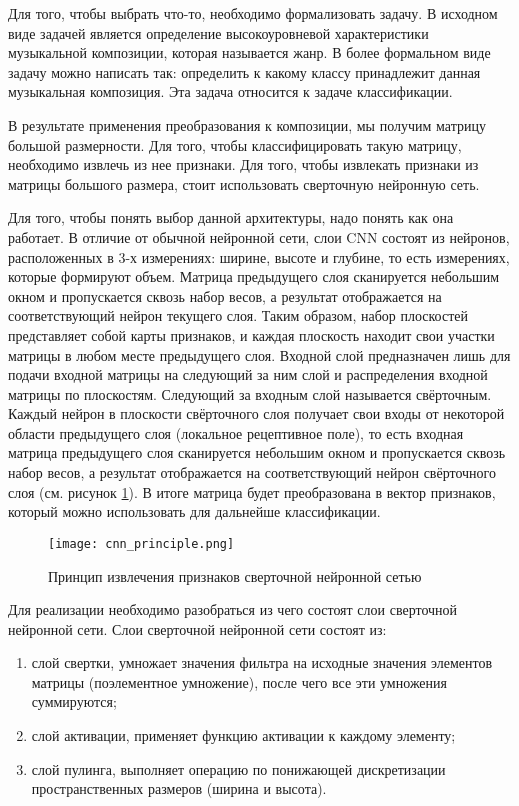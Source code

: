 Для того, чтобы выбрать что-то, необходимо формализовать задачу. В исходном виде задачей является определение высокоуровневой характеристики музыкальной композиции, которая называется жанр. В более формальном виде задачу можно написать так: определить к какому классу принадлежит данная музыкальная композиция. Эта задача относится к задаче классификации.

В результате применения преобразования к композиции, мы получим матрицу большой размерности. Для того, чтобы классифицировать такую матрицу, необходимо извлечь из нее признаки. Для того, чтобы извлекать признаки из матрицы большого размера, стоит использовать сверточную нейронную сеть.

Для того, чтобы понять выбор данной архитектуры, надо понять как она работает. В отличие от обычной нейронной сети, слои CNN состоят из нейронов, расположенных в 3-х измерениях: ширине, высоте и глубине, то есть измерениях, которые формируют объем. Матрица предыдущего слоя сканируется небольшим окном и пропускается сквозь набор весов, а результат отображается на соответствующий нейрон текущего слоя. Таким образом, набор плоскостей представляет собой карты признаков, и каждая плоскость находит свои участки матрицы в любом месте предыдущего слоя. Входной слой предназначен лишь для подачи входной матрицы на следующий за ним слой и распределения входной матрицы по плоскостям. Следующий за входным слой называется свёрточным. Каждый нейрон в плоскости свёрточного слоя получает свои входы от некоторой области предыдущего слоя (локальное рецептивное поле), то есть входная матрица предыдущего слоя сканируется небольшим окном и пропускается сквозь набор весов, а результат отображается на соответствующий нейрон свёрточного слоя (см. рисунок \ref{sec:design:network:cnn_layers}). В итоге матрица будет преобразована в вектор признаков, который можно использовать для дальнейше классификации.

\begin{figure}[h]
\centering
	\texttt{[image: cnn\_principle.png]}
	\caption{Принцип извлечения признаков сверточной нейронной сетью}
	\label{sec:design:network:cnn_layers}
\end{figure}

Для реализации необходимо разобраться из чего состоят слои сверточной нейронной сети. Слои сверточной нейронной сети состоят из:
\begin{enumerate}
  \item слой свертки, умножает значения фильтра на исходные значения элементов матрицы (поэлементное умножение), после чего все эти умножения суммируются;
  \item слой активации, применяет функцию активации к каждому \linebreak элементу;
  \item слой пулинга, выполняет операцию по понижающей дискретизации пространственных размеров (ширина и высота).
\end{enumerate}

